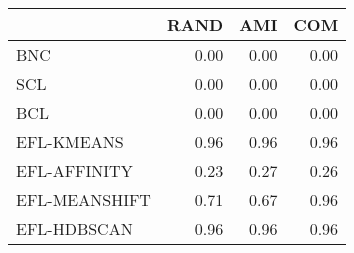 \begin{tabular}{lrrr}
\toprule
 & RAND & AMI & COM \\
\midrule
BNC & 0.00 & 0.00 & 0.00 \\
SCL & 0.00 & 0.00 & 0.00 \\
BCL & 0.00 & 0.00 & 0.00 \\
EFL-KMEANS & 0.96 & 0.96 & 0.96 \\
EFL-AFFINITY & 0.23 & 0.27 & 0.26 \\
EFL-MEANSHIFT & 0.71 & 0.67 & 0.96 \\
EFL-HDBSCAN & 0.96 & 0.96 & 0.96 \\
\bottomrule
\end{tabular}
